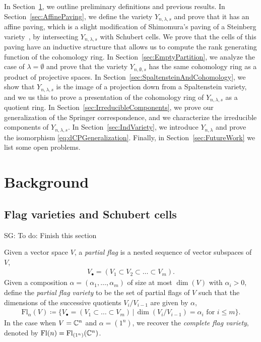 \documentclass[12pt]{amsart}
\newcommand{\st}{\,|\,}
\newcommand{\Fl}{\mathrm{Fl}}
\newcommand{\la}{\lambda}
\newcommand{\SG}[1]{{\color{red} SG: #1}}
\begin{document}
In Section~\ref{sec:Background}, we outline preliminary definitions and previous results. In Section~\ref{sec:AffinePaving}, we define the variety $Y_{n,\lambda,s}$ and prove that it has an affine paving, which is a slight modification of Shimomura's paving of a Steinberg variety~\cite{Shimomura}, by intersecting $Y_{n,\lambda,s}$ with Schubert cells. We prove that the cells of this paving have an inductive structure that allows us to compute the rank generating function of the cohomology ring.
In Section~\ref{sec:EmptyPartition}, we analyze the case of $\lambda=\emptyset$ and prove that the variety $Y_{n,\emptyset,s}$ has the same cohomology ring as a product of projective spaces.
In Section~\ref{sec:SpaltensteinAndCohomology}, we show that $Y_{n,\la,s}$ is the image of a projection down from a Spaltenstein variety, and we us this to prove a presentation of the cohomology ring of $Y_{n,\lambda,s}$ as a quotient ring.
In Section~\ref{sec:IrreducibleComponents}, we prove our generalization of the Springer correspondence, and we characterize the irreducible components of $Y_{n,\la,s}$.
In Section~\ref{sec:IndVariety}, we introduce $Y_{n,\la}$ and prove the isomorphism \eqref{eq:dCPGeneralization}.
Finally, in Section~\ref{sec:FutureWork} we list some open problems.






\section{Background}\label{sec:Background}


\subsection{Flag varieties and Schubert cells}


\SG{To do: Finish this section}

Given a vector space $V$, a \emph{partial flag} is a nested sequence of vector subspaces of $V$,
\begin{align}
    V_\bullet = (V_1\subset V_2\subset\dots\subset V_m).
\end{align}
Given a composition $\alpha = (\alpha_1,\dots, \alpha_m)$ of size at most $\dim(V)$ with $\alpha_i>0$,  define the \emph{partial flag variety} to be the set of partial flags of $V$ such that the dimensions of the successive quotients $V_i/V_{i-1}$ are given by $\alpha$,
\begin{align}
    \Fl_{\alpha}(V) \coloneqq \{V_\bullet = (V_1\subset\dots\subset V_m) \st  \dim(V_i/V_{i-1}) = \alpha_i\text{ for }i\leq m\}.
\end{align}
In the case when $V = \mathbb{C}^n$ and $\alpha = (1^n)$, we recover the \emph{complete flag variety}, denoted by $\Fl(n) = \Fl_{(1^n)}(\bC^n)$.
\end{document}
